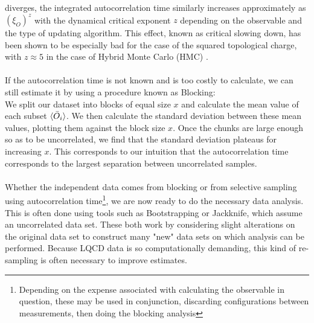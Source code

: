 \documentclass[a4paper,10pt]{article}
\begin{document}
diverges, the integrated autocorrelation time similarly increases approximately as $\left(\xi_{O}\right)^{z}$ with the dynamical critical exponent $z$ depending on the observable and the type of updating algorithm. This effect, known as critical slowing down, has been shown to be especially bad for the case of the squared topological charge, with $z\approx 5$ in the case of Hybrid Monte Carlo (HMC) \cite{2011}.\\\\If the autocorrelation time is not known and is too costly to calculate, we can still estimate it by using a procedure known as Blocking:\\We split our dataset into blocks of equal size $x$ and calculate the mean value of each subset $\braket{\bar{O}_i}$. We then calculate the standard deviation between these mean values, plotting them against the block size $x$. Once the chunks are large enough so as to be uncorrelated, we find that the standard deviation plateaus for increasing $x$. This corresponds to our intuition that the autocorrelation time corresponds to the largest separation between uncorrelated samples.\\\\Whether the independent data comes from blocking or from selective sampling using autocorrelation time\footnote{Depending on the expense associated with calculating the observable in question, these may be used in conjunction, discarding configurations between measurements, then doing the blocking analysis}, we are now ready to do the necessary data analysis. This is often done using tools such as Bootstrapping or Jackknife, which assume an uncorrelated data set. These both work by considering slight alterations on the original data set to construct many "new" data sets on which analysis can be performed. Because LQCD data is so computationally demanding, this kind of re-sampling is often necessary to improve estimates.
\end{document}
